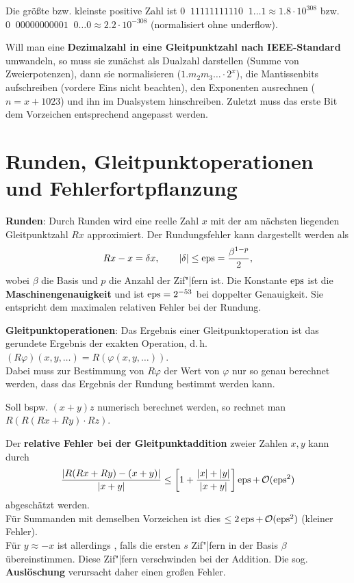 Die größte bzw. kleinste positive Zahl ist
$0\;\;11111111110\;\;1 \ldots 1 \approx 1.8 \cdot 10^{308}$ bzw. \\
$0\;\;00000000001\;\;0 \ldots 0 \approx 2.2 \cdot 10^{-308}$
(normalisiert ohne underflow).

Will man eine
\textbf{Dezimalzahl in eine Gleitpunktzahl nach IEEE-Standard}
umwandeln, so muss sie zunächst als Dualzahl darstellen
(Summe von Zweierpotenzen), dann sie normalisieren
($1.m_2 m_3\ldots \cdot 2^x$), die Mantissenbits aufschreiben (vordere Eins
nicht beachten), den Exponenten ausrechnen ($n = x + 1023$)
und ihn im Dualsystem hinschreiben.
Zuletzt muss das erste Bit dem Vorzeichen entsprechend angepasst werden.

\pagebreak

\section{%
    Runden, Gleitpunktoperationen und Fehlerfortpflanzung%
}

\textbf{Runden}:
Durch Runden wird eine reelle Zahl $x$ mit der am nächsten liegenden
Gleitpunktzahl $Rx$ approximiert.
Der Rundungsfehler kann dargestellt werden als
\begin{align*}
    Rx - x = \delta x, \qquad
    |\delta| \le \operatorname{eps} = \frac{\beta^{1-p}}{2},
\end{align*}
wobei $\beta$ die Basis und $p$ die Anzahl der Zif"|fern ist.
Die Konstante $\operatorname{eps}$ ist die \textbf{Maschinengenauigkeit} und ist
$\operatorname{eps} = 2^{-53}$ bei doppelter Genauigkeit.
Sie entspricht dem maximalen relativen Fehler bei der Rundung.

\textbf{Gleitpunktoperationen}:
Das Ergebnis einer Gleitpunktoperation ist das gerundete Ergebnis
der exakten Operation, d.\,h.
$(R \varphi)(x, y, \ldots) = R(\varphi(x, y, \ldots))$. \\
Dabei muss zur Bestimmung von $R \varphi$ der Wert von $\varphi$ nur so genau
berechnet werden, dass das Ergebnis der Rundung bestimmt werden kann.

Soll bspw. $(x + y) z$ numerisch berechnet werden, so rechnet man
$R(R(Rx + Ry) \cdot Rz)$.

\linie

Der \textbf{relative Fehler bei der Gleitpunktaddition} zweier Zahlen
$x, y$ kann durch
\begin{align*}
    \frac{|R(Rx + Ry) - (x + y)|}{|x + y|}
    \le \left[1 + \frac{|x| + |y|}{|x + y|}\right] \operatorname{eps} + \operatorname{\mathcal{O}}(\operatorname{eps}^2)
\end{align*}
abgeschätzt werden. \\
Für Summanden mit demselben Vorzeichen ist dies $\le 2\operatorname{eps} + \operatorname{\mathcal{O}}(\operatorname{eps}^2)$
(kleiner Fehler). \\
Für $y \approx -x$ ist allerdings
, falls
die ersten $s$ Zif"|fern in der Basis $\beta$ übereinstimmen.
Diese Zif"|fern verschwinden bei der Addition.
Die sog. \textbf{Auslöschung} verursacht daher einen großen Fehler.

